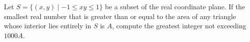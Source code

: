 Let $S=\{(x,y)\mid -1\leq xy\leq 1\}$ be a subset of the real coordinate plane. If the smallest real number that is greater than or equal to the area of any triangle whose interior lies entirely in $S$ is $A$, compute the greatest integer not exceeding $1000A$.
